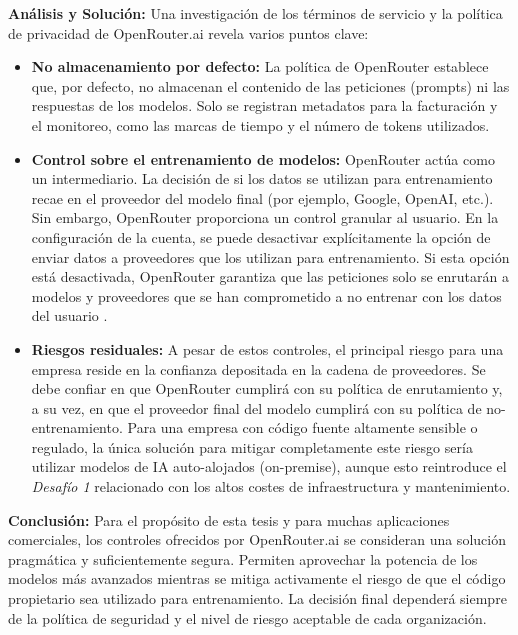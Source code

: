 \textbf{Análisis y Solución:} Una investigación de los términos de servicio y la política de privacidad de OpenRouter.ai \cite{OpenRouterTOS} revela varios puntos clave:
\begin{itemize}
    \item \textbf{No almacenamiento por defecto:} La política de OpenRouter establece que, por defecto, no almacenan el contenido de las peticiones (prompts) ni las respuestas de los modelos. Solo se registran metadatos para la facturación y el monitoreo, como las marcas de tiempo y el número de tokens utilizados.
    \item \textbf{Control sobre el entrenamiento de modelos:} OpenRouter actúa como un intermediario. La decisión de si los datos se utilizan para entrenamiento recae en el proveedor del modelo final (por ejemplo, Google, OpenAI, etc.). Sin embargo, OpenRouter proporciona un control granular al usuario. En la configuración de la cuenta, se puede desactivar explícitamente la opción de enviar datos a proveedores que los utilizan para entrenamiento. Si esta opción está desactivada, OpenRouter garantiza que las peticiones solo se enrutarán a modelos y proveedores que se han comprometido a no entrenar con los datos del usuario \cite{OpenRouterPrivacy}.
    \item \textbf{Riesgos residuales:} A pesar de estos controles, el principal riesgo para una empresa reside en la confianza depositada en la cadena de proveedores. Se debe confiar en que OpenRouter cumplirá con su política de enrutamiento y, a su vez, en que el proveedor final del modelo cumplirá con su política de no-entrenamiento. Para una empresa con código fuente altamente sensible o regulado, la única solución para mitigar completamente este riesgo sería utilizar modelos de IA auto-alojados (on-premise), aunque esto reintroduce el \textit{Desafío 1} relacionado con los altos costes de infraestructura y mantenimiento.
\end{itemize}

\textbf{Conclusión:} Para el propósito de esta tesis y para muchas aplicaciones comerciales, los controles ofrecidos por OpenRouter.ai se consideran una solución pragmática y suficientemente segura. Permiten aprovechar la potencia de los modelos más avanzados mientras se mitiga activamente el riesgo de que el código propietario sea utilizado para entrenamiento. La decisión final dependerá siempre de la política de seguridad y el nivel de riesgo aceptable de cada organización.

